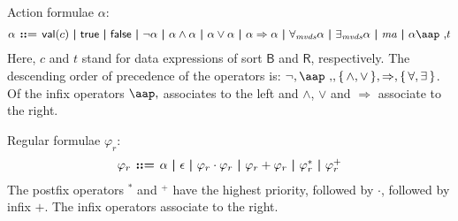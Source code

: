 \documentclass[a4paper,fleqn,10pt]{article}
\makeatletter
\newcommand{\f}[1]{\ensuremath{\mathit{#1}}}
\newcommand{\sbool}{\ensuremath{\mathsf{B}}}
\newcommand{\sreal}{\ensuremath{\mathsf{R}}}
\newenvironment{tightarray}[1]
  {\setlength{\arraycolsep}{2pt}%
   \begin{array}{@{}#1@{}}%
  }
  {\end{array}%
  }
\newcommand{\set}[1]{\ensuremath{\{\,#1\,\}}}
\newcommand{\at}[1]{\mbox{\aap ,} #1}
\newcommand{\limp}{\ensuremath{\Rightarrow}}
\newcommand{\mb}[1]{\text{\boldmath$#1$}}
\makeatother
\begin{document}
\noindent
Action formulae $\alpha$:
\[\begin{tightarray}{lrl}
\alpha & \mb{::=} & \mathsf{val}(c)\ \mb{|}\ 
                       \mathsf{true}\ \mb{|}\ 
                       \mathsf{false}\ \mb{|}\ 
                       \neg \alpha\ \mb{|}\ 
                       \alpha \land \alpha\ \mb{|}\ 
                       \alpha \lor  \alpha\ \mb{|}\ 
                       \alpha \limp \alpha\ \mb{|}\ 
                       \forall_{\f{mvds}} \alpha\ \mb{|}\ 
                       \exists_{\f{mvds}} \alpha\ \mb{|}\ 
                       \f{ma}\ \mb{|}\ 
                       \alpha\at t\\
\end{tightarray}\]
Here, $c$ and $t$ stand for data expressions of sort $\sbool$ and $\sreal$,
respectively.  The descending order of precedence of the operators is: $\neg,
\at, \set{\land,\lor}, \limp, \set{\forall, \exists}$.  Of the infix operators
$\at$ associates to the left and $\land$, $\lor$ and $\limp$ associate to the
right.

Regular formulae $\varphi_r$:
\[\begin{tightarray}{lrl}
\varphi_r & \mb{::=} & \alpha\ \mb{|}\ 
                       \epsilon\ \mb{|}\ 
                       \varphi_r \cdot \varphi_r\ \mb{|}\ 
                       \varphi_r + \varphi_r\ \mb{|}\ 
                       \varphi_r^{*} \ \mb{|}\ 
                       \varphi_r^{+}
\end{tightarray}\]
The postfix operators ${}^{*}$ and ${}^{+}$ have the highest priority, followed
by $\cdot$, followed by infix $+$. The infix operators associate to the right.
\end{document}
